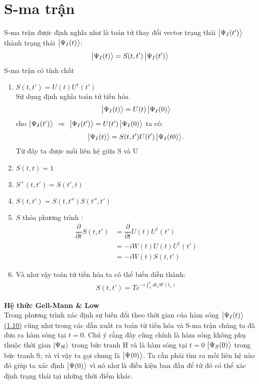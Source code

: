 \documentclass{report}
\begin{document}
\section{S-ma trận}
S-ma trận được định nghĩa như là toán tử thay đổi vector trạng thái $\ket{\Psi_{I}(t')}$ thành trạng thái $\ket{\Psi_{I}(t)}$:
\begin{align}\label{eq1.24}
	\ket{\Psi_{I}(t)}  = S(t,t') \ket{\Psi_{I}(t')}
\end{align}
S-ma trận có tính chất
\begin{enumerate}
	\label{tc1}
	\item $S(t,t') = U(t)U^{\dagger}(t')$\\
	      Sử dụng định nghĩa toán tử tiến hóa
	      \begin{align*}
		      \ket{\Psi_{I}(t)} = U(t) \ket{\Psi_{I}(0)}
	      \end{align*}
	      cho $\ket{\Psi_{I}(t')}$ $\Rightarrow$ $\ket{\Psi_{I}(t')} = U(t') \ket{\Psi_{I}(0)} $  ta có:
	      \begin{align*}
		      \ket{\Psi_{I}(t)}  = S(t,t')U(t') \ket{\Psi_{I}(t0)}.
	      \end{align*}
	      Từ đây ta được mối liên hệ giữa S và U
	      \label{tc2}
	\item $S(t,t) = 1$
	\item $S^{+}(t,t') = S(t',t)$
	      \label{tc4}
	\item $S(t,t') = S(t,t'')S(t'',t')$
	\item $S$ thỏa phương trình :
	      \begin{align}
		      \dfrac{\partial}{\partial t} S(t,t')
		       & = \dfrac{\partial}{\partial t}U(t)U^{\dagger}(t')\nonumber \\
		       & = -iW(t)U(t)U^{\dagger}(t')\nonumber                       \\
		       & = -iW(t)S(t,t')
	      \end{align}
	\item Và như vậy toán tử tiến hóa ta có thể biểu diễn thành:
	      \begin{align}
		      S(t,t') = T e^{-i \int_{t'}^{t} dt_1 W(t_1)}
	      \end{align}
\end{enumerate}
\textbf{Hệ thức Gell-Mann \& Low}\\
\indent Trong phương trình xác định sự biến đổi theo thời gian của hàm sóng $\ket{\Psi_{I}(t)}$ \hyperref[eq1.10]{(1.10)} cũng như trong các dẫn xuất ra toán tử tiến hóa và S-ma trận chúng ta đã đưa ra hàm sóng tại $t=0$. Chú ý rằng đây cũng chính là hàm sóng không phụ thuộc thời gian $\ket{\Psi_{H}}$ trong bức tranh H và là hàm sóng tại $t=0$ $\ket{\Psi_{S}(0)}$ trong bức tranh S; và vì vậy ta gọi chung là $\ket{\Psi(0)}$. Ta cần phải tìm ra mối liên hệ nào đó giúp ta xác định $\ket{\Psi(0)}$ vì nó như là điều kiện ban đầu để từ đó có thể xác định trạng thái tại những thời điểm khác.\\
\end{document}
